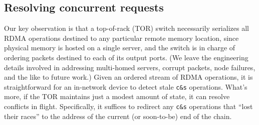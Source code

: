 




\subsection{Resolving concurrent requests}

Our key observation is that a top-of-rack (TOR) switch necessarily
serializes all RDMA operations destined to any particular remote memory
location, since physical memory is hosted on a single server, and the
switch is in charge of ordering packets destined to each of its output
ports.  (We leave the engineering details involved in addressing
multi-homed servers, corrupt packets, node failures, and the like to
future work.)  Given an ordered stream of RDMA operations, it is
straightforward for an in-network device to detect stale \texttt{c\&s}
operations.  What's more, if the TOR maintains just a modest amount of
state, it can resolve conflicts in flight.  Specifically, it suffices
to redirect any \texttt{c\&s} operations that ``lost their races'' to the
address of the current (or soon-to-be) end of the chain.


